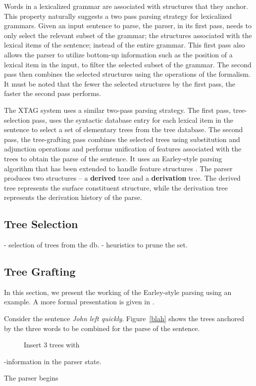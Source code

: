 Words in a lexicalized grammar are associated with structures that
they anchor. This property naturally suggests a two pass parsing
strategy for lexicalized grammars. Given an input sentence to parse,
the parser, in its first pass, needs to only select the relevant
subset of the grammar; the structures associated with the lexical
items of the sentence; instead of the entire grammar. This first pass
also allows the parser to utilize bottom-up information such as the
position of a lexical item in the input, to filter the selected subset
of the grammar. The second pass then combines the selected structures
using the operations of the formalism. It must be noted that the fewer
the selected structures by the first pass, the faster the second pass
performs.

The XTAG system uses a similar two-pass parsing strategy. The first
pass, tree-selection pass, uses the syntactic database entry for each
lexical item in the sentence to select a set of elementary trees from
the tree database. The second pass, the tree-grafting pass combines
the selected trees using substitution and adjunction operations and
performs unification of features associated with the trees to obtain
the parse of the sentence. It uses an Earley-style parsing algorithm
that has been extended to handle feature structures \cite{schabes90}.
The parser produces two structures -- a {\bf derived} tree and a {\bf
derivation} tree. The derived tree represents the surface constituent
structure, while the derivation tree represents the derivation history
of the parse.


\subsection{Tree Selection}

- selection of trees from the db.
- heuristics to prune the set.

\subsection{Tree Grafting}

In this section, we present the working of the Earley-style parsing
using an example. A more formal presentation is given in
\cite{schabes90}.

Consider the sentence {\it John left quickly}. Figure~\ref{blah} shows
the trees anchored by the three words to be combined for the parse of
the sentence.

\begin{figure}

Insert 3 trees with 
\end{figure}

-information in the parser state.

The parser begins 